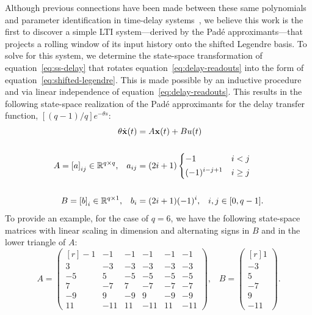 Although previous connections have been made between these same polynomials and parameter identification in time-delay systems~\citep{hwang1985analysis}, we believe this work is the
first to discover a simple LTI system---derived by the Pad\'e approximants---that projects a rolling window of its input history onto the shifted Legendre basis.
To solve for this system, we determine the state-space transformation of equation~\ref{eq:ss-delay} that rotates equation~\ref{eq:delay-readouts} into the form of equation~\ref{eq:shifted-legendre}.
This is made possible by an inductive procedure and via linear independence of equation~\ref{eq:delay-readouts}.
This results in the following state-space realization of the Pad\'e approximants for the delay transfer function, $[(q-1)/q]e^{-\theta s}$:
\begin{equation} \label{eq:legendre-delay}
\begin{aligned}
\theta \dot{\mathbf{x}}(t) &= A\mathbf{x}(t) + Bu(t) \\
\\
A = \left[ a \right]_{ij} \in \mathbb{R}^{q \times q} \text{,} \quad
a_{ij} &= \left(2i + 1\right)
\begin{dcases} 
  -1 & i < j \\
  (-1)^{i-j+1} & i \ge j
\end{dcases} \\
\\
B = \left[ b \right]_i \in \mathbb{R}^{q \times 1} \text{,} \quad
b_i &= (2i + 1) (-1)^i \text{,} \quad i, j \in [0, q-1] \text{.}
\end{aligned}
\end{equation}
To provide an example, for the case of $q = 6$, we have the following state-space matrices with linear scaling in dimension and alternating signs in $B$ and in the lower triangle of $A$:
\begin{equation}
A = \begin{pmatrix*}[r]
 -1 & -1 & -1 & -1 & -1 & -1 \\
  3 & -3 & -3 & -3 & -3 & -3 \\
 -5 &  5 & -5 & -5 & -5 & -5 \\
  7 & -7 &  7 & -7 & -7 & -7 \\
 -9 &  9 & -9 &  9 & -9 & -9 \\
 11 &-11 & 11 &-11 & 11 & -11
\end{pmatrix*} \text{,} \quad
B = \begin{pmatrix*}[r] 1 \\ -3 \\ 5 \\ -7 \\ 9 \\ -11\end{pmatrix*} \text{.}
\end{equation}
